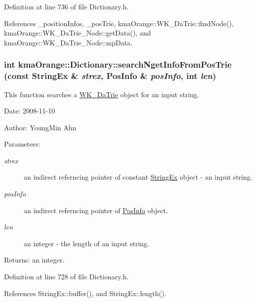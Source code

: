 Definition at line 736 of file Dictionary.h.

References \_\-positionInfos, \_\-posTrie, kmaOrange::WK\_\-DaTrie::findNode(), kmaOrange::WK\_\-DaTrie\_\-Node::getData(), and kmaOrange::WK\_\-DaTrie\_\-Node::mpData.\hypertarget{classkmaOrange_1_1Dictionary_7d2d37b55370baed7780214767862ce6}{
\subsubsection[{searchNgetInfoFromPosTrie}]{\setlength{\rightskip}{0pt plus 5cm}int kmaOrange::Dictionary::searchNgetInfoFromPosTrie (const {\bf StringEx} \& {\em strex}, \/  {\bf PosInfo} \& {\em posInfo}, \/  int {\em len})}}
\label{classkmaOrange_1_1Dictionary_7d2d37b55370baed7780214767862ce6}


This function searches a \hyperlink{classkmaOrange_1_1WK__DaTrie}{WK\_\-DaTrie} object for an input string. 

\begin{Desc}
\item[Date:]2008-11-10 \end{Desc}
\begin{Desc}
\item[Author:]YoungMin Ahn \end{Desc}
\begin{Desc}
\item[Parameters:]
\begin{description}
\item[{\em strex}]an indirect referncing pointer of constant \hyperlink{classStringEx}{StringEx} object - an input string. \item[{\em posInfo}]an indirect referncing pointer of \hyperlink{classPosInfo}{PosInfo} object. \item[{\em len}]an integer - the length of an input string. \end{description}
\end{Desc}
\begin{Desc}
\item[Returns:]an integer. \end{Desc}


Definition at line 728 of file Dictionary.h.

References StringEx::buffer(), and StringEx::length().

